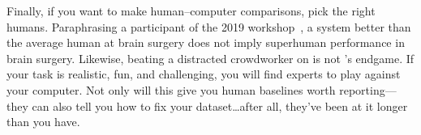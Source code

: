Finally, if you want to make human--computer comparisons, pick the right humans.  Paraphrasing
a participant of the 2019  workshop~\cite{fisch-19}, a system better than the average human at brain surgery does not imply superhuman performance in brain surgery.  
Likewise, beating a distracted crowdworker on  is not 's endgame.  
If your task is realistic, fun, and challenging, you will find experts to play against your computer.
Not only will this give you human baselines worth reporting---they can also tell you how to fix your  dataset\dots after all, they've been at it longer than you have.
